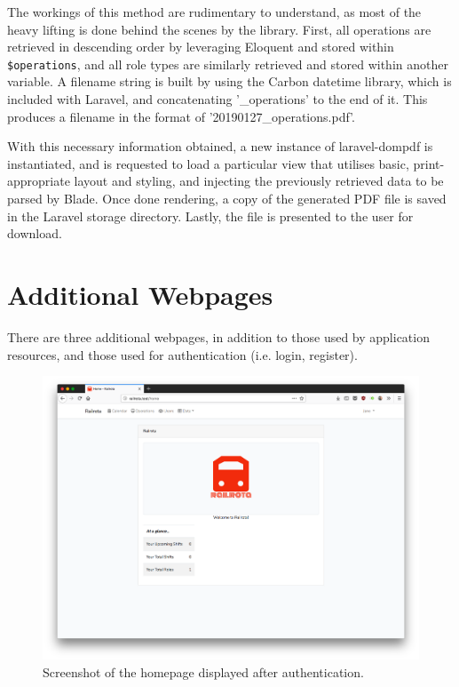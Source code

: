 The workings of this method are rudimentary to understand, as most of the heavy lifting is done behind the scenes by the library. First, all operations are retrieved in descending order by leveraging Eloquent and stored within \texttt{\$operations}, and all role types are similarly retrieved and stored within another variable. A filename string is built by using the Carbon datetime library, which is included with Laravel, and concatenating '\_operations' to the end of it. This produces a filename in the format of '20190127\_operations.pdf'.

With this necessary information obtained, a new instance of laravel-dompdf is instantiated, and is requested to load a particular view that utilises basic, print-appropriate layout and styling, and injecting the previously retrieved data to be parsed by Blade. Once done rendering, a copy of the generated PDF file is saved in the Laravel storage directory. Lastly, the file is presented to the user for download.

\section{Additional Webpages}
There are three additional webpages, in addition to those used by application resources, and those used for authentication (i.e. login, register).

\begin{figure}[!ht]
    \centering
    \includegraphics[width=1.0\textwidth]{Figures/screenshot-homepage}
    \caption{Screenshot of the homepage displayed after authentication.}
    \label{fig:homepage-screenshot}
\end{figure}

